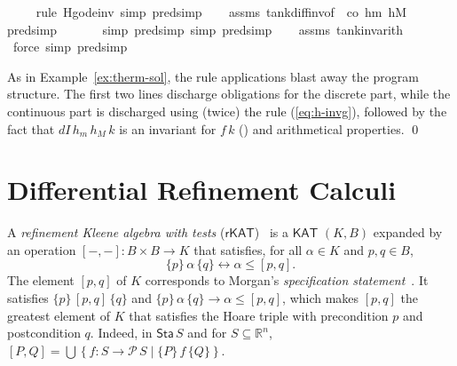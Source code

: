 \documentclass[envcountsame,envcountsect]{llncs}
\newcommand{\KAT}{\mathsf{KAT}}
\newcommand{\rKAT}{\mathsf{rKAT}}
\newcommand{\Pow}{\mathcal{P}}
\newcommand{\reals}{\mathbb{R}}
\newcommand{\sta}{\mathsf{Sta}}
\begin{document}
\begin{example}
\begin{isabellebody}
\ \ \ \ \isamarkupfalse%
{\isacharparenleft}rule\ H{\isacharunderscore}g{\isacharunderscore}ode{\isacharunderscore}inv{\isacharcomma}\ simp{\isacharcomma}\ pred{\isacharunderscore}simp{\isacharparenright}\isanewline
\ \ \isamarkupfalse%
\ assms\ tank{\isacharunderscore}diff{\isacharunderscore}inv{\isacharbrackleft}of\ {\isacharunderscore}\ {\isachardoublequoteopen}{\isacharminus}c\isactrlsub o{\isachardoublequoteclose}\ h\isactrlsub m\ h\isactrlsub M{\isacharbrackright}\ \isamarkupfalse%
{\isacharparenleft}pred{\isacharunderscore}simp{\isacharparenright}\isanewline
\ \ \ \ \ \ \isamarkupfalse%
{\isacharparenleft}simp{\isacharcomma}\ pred{\isacharunderscore}simp{\isacharcomma}\ simp{\isacharcomma}\ pred{\isacharunderscore}simp{\isacharparenright}\isanewline
\ \ \isamarkupfalse%
\ assms\ tank{\isacharunderscore}inv{\isacharunderscore}arith{}\ \isamarkupfalse%
\ force\ {\isacharparenleft}simp{\isacharcomma}\ pred{\isacharunderscore}simp{\isacharparenright}\isanewline
\end{isabellebody}

As in Example~\ref{ex:therm-sol}, the rule applications blast away the
program structure. The first two lines discharge obligations for the discrete
part, while the continuous part is discharged using (twice) the rule
(\ref{eq:h-invg}), followed by the fact that $dI\, h_m\, h_M\, k$ is an
invariant for $f\, k$
() and arithmetical properties. \qed
\end{example}


\section{Differential Refinement Calculi}\label{sec:refine}

A \emph{refinement Kleene algebra with tests}
($\rKAT$)~\cite{ArmstrongGS16}  is a $\KAT$
$(K,B)$ expanded by an operation $[-,-]:B\times B\to K$ that
satisfies, for all $\alpha \in K$ and $p,q\in B$, 
\begin{equation*}
  \{p\}\, \alpha\, \{q\} \leftrightarrow \alpha\le [p,q].
\end{equation*}
The element $[p,q]$ of $K$ corresponds to Morgan's \emph{specification
  statement}~\cite{Morgan94}. It satisfies $\{p\}\, [p,q]\, \{q\}$
and $\{p\}\, \alpha\, \{q\} \rightarrow \alpha\le [p,q]$, 
which makes $[p,q]$ the greatest element of $K$ that satisfies the Hoare
triple with precondition $p$ and postcondition $q$.  Indeed, in
$\sta\, S$ and for $S\subseteq \reals^n$,
$ [P,Q] = \bigcup \left\{f:S\to \Pow\, S \mid \{P\}\, f\,
  \{Q\}\right\}$. 
\end{document}
